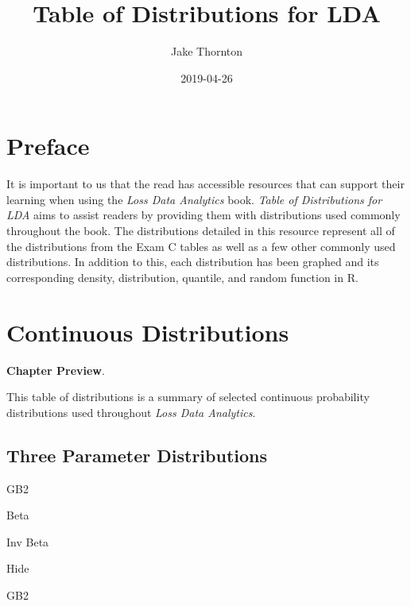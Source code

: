 \documentclass[]{book}
\title{Table of Distributions for LDA}
\author{Jake Thornton}
\date{2019-04-26}
\begin{document}
\maketitle

{
\setcounter{tocdepth}{2}
\tableofcontents
}
\chapter*{Preface}\label{preface}

It is important to us that the read has accessible resources that can
support their learning when using the \emph{Loss Data Analytics} book.
\emph{Table of Distributions for LDA} aims to assist readers by
providing them with distributions used commonly throughout the book. The
distributions detailed in this resource represent all of the
distributions from the Exam C tables as well as a few other commonly
used distributions. In addition to this, each distribution has been
graphed and its corresponding density, distribution, quantile, and
random function in R.

\chapter{Continuous Distributions}\label{continuous-distributions}

\textbf{Chapter Preview}.

This table of distributions is a summary of selected continuous
probability distributions used throughout \emph{Loss Data Analytics}.

\section{Three Parameter
Distributions}\label{three-parameter-distributions}

GB2

Beta

Inv Beta

\hypertarget{3pA}{}
{Hide}

GB2
\end{document}

